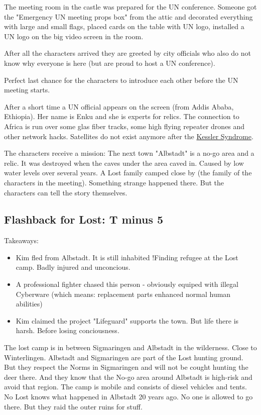 The meeting room in the castle was prepared for the UN conference. Someone got the "Emergency UN meeting props box" from the attic and decorated everything with large and small flags, placed cards on the table with UN logo, installed a UN logo on the big video screen in the room.

After all the characters arrived they are greeted by city officials who also do not know why everyone is here (but are proud to host a UN conference).

Perfect last chance for the characters to introduce each other before the UN meeting starts.

After a short time a UN official appears on the screen (from Addis Ababa, Ethiopia). Her name is Enku and she is experts for relics.
The connection to Africa is run over some glas fiber tracks, some high flying repeater drones and other network hacks. Satellites do not exist anymore after the \hyperref[sec:Kessler Syndrome]{Kessler Syndrome}.

The characters receive a mission:
The next town "Albstadt" is a no-go area and a relic. It was destroyed when the caves under the area caved in. Caused by low water levels over several years. A Lost family camped close by (the family of the characters in the meeting). Something strange happened there. But the characters can tell the story themselves.


\subsection{Flashback for Lost: T minus 5}

Takeaways:

\begin{itemize}
    \item Kim fled from Albstadt. It is still inhabited !Finding refugee at the Lost camp. Badly injured and unconcious.
    \item A professional fighter chased this person - obviously equiped with illegal Cyberware (which means: replacement parts enhanced normal human abilities)
    \item Kim claimed the project "Lifeguard" supports the town. But life there is harsh. Before losing conciousness.
\end{itemize}


The lost camp is in between Sigmaringen and Albstadt in the wilderness. Close to Winterlingen. Albstadt and Sigmaringen are part of the Lost hunting ground. But they respect the Norms in Sigmaringen and will not be cought hunting the deer there. And they know that the No-go area around Albstadt is high-risk and avoid that region. The camp is mobile and consists of diesel vehicles and tents. No Lost knows what happened in Albstadt 20 years ago. No one is allowed to go there. But they raid the outer ruins for stuff.

